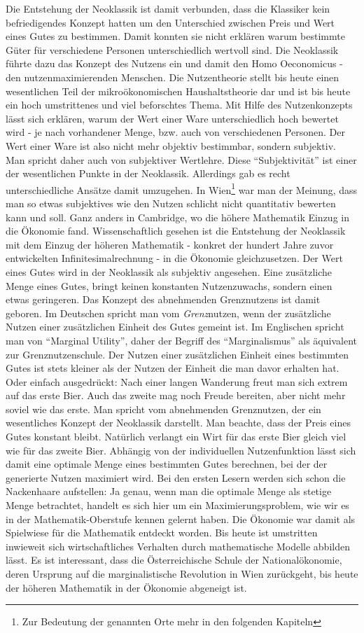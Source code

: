 Die Entstehung der Neoklassik ist damit verbunden, dass die Klassiker kein befriedigendes Konzept hatten um den Unterschied zwischen Preis und Wert eines Gutes zu bestimmen. Damit konnten sie nicht erklären warum bestimmte Güter für verschiedene Personen unterschiedlich wertvoll sind. Die Neoklassik führte dazu das Konzept des Nutzens ein und damit den Homo Oeconomicus - den nutzenmaximierenden Menschen. Die Nutzentheorie stellt bis heute einen wesentlichen Teil der mikroökonomischen Haushaltstheorie dar und ist bis heute ein hoch umstrittenes und viel beforschtes Thema. Mit Hilfe des Nutzenkonzepts lässt sich erklären, warum der Wert einer Ware unterschiedlich hoch bewertet wird - je nach vorhandener Menge, bzw. auch von verschiedenen Personen. Der Wert einer Ware ist also nicht mehr objektiv bestimmbar, sondern subjektiv. Man spricht daher auch von subjektiver Wertlehre. Diese "`Subjektivität"' ist einer der wesentlichen Punkte in der Neoklassik. Allerdings gab es recht unterschiedliche Ansätze damit umzugehen. In Wien\footnote{Zur Bedeutung der genannten Orte mehr in den folgenden Kapiteln} war man der Meinung, dass man so etwas subjektives wie den Nutzen schlicht nicht quantitativ bewerten kann und soll. Ganz anders in Cambridge, wo die höhere Mathematik Einzug in die Ökonomie fand. Wissenschaftlich gesehen ist die Entstehung der Neoklassik mit dem Einzug der höheren Mathematik - konkret der hundert Jahre zuvor entwickelten Infinitesimalrechnung -  in die Ökonomie gleichzusetzen. Der Wert eines Gutes wird in der Neoklassik als subjektiv angesehen. Eine zusätzliche Menge eines Gutes, bringt keinen konstanten Nutzenzuwachs, sondern einen etwas geringeren. Das Konzept des abnehmenden Grenznutzens ist damit geboren. Im Deutschen spricht man vom \textit{Grenz}nutzen, wenn der zusätzliche Nutzen einer zusätzlichen Einheit des Gutes gemeint ist. Im Englischen spricht man von "`Marginal Utility"', daher der Begriff des "`Marginalismus"' als äquivalent zur Grenznutzenschule. Der Nutzen einer zusätzlichen Einheit eines bestimmten Gutes ist stets kleiner als der Nutzen der Einheit die man davor erhalten hat. Oder einfach ausgedrückt: Nach einer langen Wanderung freut man sich extrem auf das erste Bier. Auch das zweite mag noch Freude bereiten, aber nicht mehr soviel wie das erste. Man spricht vom abnehmenden Grenznutzen, der ein wesentliches Konzept der Neoklassik darstellt. Man beachte, dass der Preis eines Gutes konstant bleibt. Natürlich verlangt ein Wirt für das erste Bier gleich viel wie für das zweite Bier. Abhängig von der individuellen Nutzenfunktion lässt sich damit eine optimale Menge eines bestimmten Gutes berechnen, bei der der generierte Nutzen maximiert wird. Bei den ersten Lesern werden sich schon die Nackenhaare aufstellen: Ja genau, wenn man die optimale Menge als stetige Menge betrachtet, handelt es sich hier um ein Maximierungsproblem, wie wir es in der Mathematik-Oberstufe kennen gelernt haben. Die Ökonomie war damit als Spielwiese für die Mathematik entdeckt worden. Bis heute ist umstritten inwieweit sich wirtschaftliches Verhalten durch mathematische Modelle abbilden lässt. Es ist interessant, dass die Österreichische Schule der Nationalökonomie, deren Ursprung auf die marginalistische Revolution in Wien zurückgeht, bis heute der höheren Mathematik in der Ökonomie abgeneigt ist.


